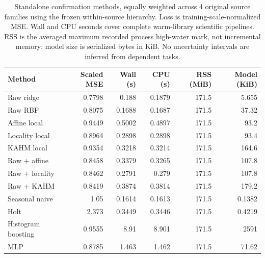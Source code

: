 \begin{table}[t]
\centering\small\setlength{\tabcolsep}{4pt}
\caption{Standalone confirmation methods, equally weighted across 4 original source families using the frozen within-source hierarchy. Loss is training-scale-normalized MSE. Wall and CPU seconds cover complete warm-library scientific pipelines. RSS is the averaged maximum recorded process high-water mark, not incremental memory; model size is serialized bytes in KiB. No uncertainty intervals are inferred from dependent tasks.}\label{tab:method-summary}
\begin{tabular}{lrrrrr}
\toprule
Method & Scaled MSE & Wall (s) & CPU (s) & RSS (MiB) & Model (KiB) \\
\midrule
Raw ridge & 0.7798 & 0.188 & 0.1879 & 171.5 & 5.655 \\
Raw RBF & 0.8075 & 0.1688 & 0.1687 & 171.5 & 37.32 \\
Affine local & 0.9449 & 0.5002 & 0.4897 & 171.5 & 93.2 \\
Locality local & 0.8964 & 0.2898 & 0.2898 & 171.5 & 93.4 \\
KAHM local & 0.9354 & 0.3218 & 0.3214 & 171.5 & 164.6 \\
Raw + affine & 0.8458 & 0.3379 & 0.3265 & 171.5 & 107.8 \\
Raw + locality & 0.8462 & 0.2791 & 0.279 & 171.5 & 107.8 \\
Raw + KAHM & 0.8419 & 0.3874 & 0.3814 & 171.5 & 179.2 \\
Seasonal naive & 1.05 & 0.1614 & 0.1613 & 171.5 & 0.1382 \\
Holt & 2.373 & 0.3449 & 0.3446 & 171.5 & 0.4219 \\
Histogram boosting & 0.9555 & 8.91 & 8.901 & 171.5 & 2591 \\
MLP & 0.8785 & 1.463 & 1.462 & 171.5 & 71.62 \\
\bottomrule
\end{tabular}
\end{table}
